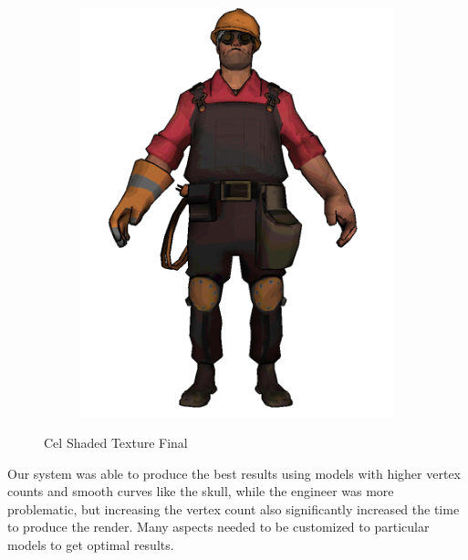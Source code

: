 
\begin{figure}[h]
    \centering
\begin{subfigure}[b]{0.28\textwidth}
        \includegraphics[width=\textwidth]{img/Textures/TextureLightingCelShade.png}
\end{subfigure}
\caption{Cel Shaded Texture Final}
 \label{fig:TextureLightingCelShade}
\end{figure}

Our system was able to produce the best results using models with higher vertex counts and smooth curves like the skull, while the engineer was more problematic, but increasing the vertex count also significantly increased the time to produce the render. Many aspects needed to be customized to particular models to get optimal results.

